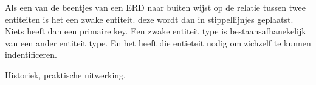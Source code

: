 Als een van de beentjes van een ERD naar buiten wijst op de relatie tussen twee entiteiten is het een zwake entiteit. deze wordt dan in stippellijnjes geplaatst. Niets heeft dan een primaire key. 
Een zwake entiteit type is bestaansafhanekelijk van een ander entiteit type.
En het heeft die entieteit nodig om zichzelf te kunnen indentificeren.

Historiek, praktische uitwerking.
